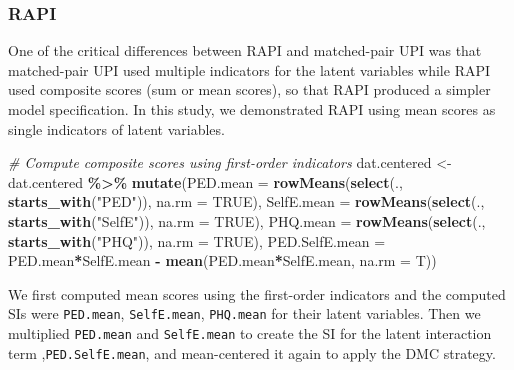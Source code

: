 \documentclass[
  man]{apa7}
\newenvironment{Shaded}{\begin{snugshade}}{\end{snugshade}}
\newcommand{\AttributeTok}[1]{\textcolor[rgb]{0.13,0.29,0.53}{#1}}
\newcommand{\CommentTok}[1]{\textcolor[rgb]{0.56,0.35,0.01}{\textit{#1}}}
\newcommand{\ConstantTok}[1]{\textcolor[rgb]{0.56,0.35,0.01}{#1}}
\newcommand{\FunctionTok}[1]{\textcolor[rgb]{0.13,0.29,0.53}{\textbf{#1}}}
\newcommand{\NormalTok}[1]{#1}
\newcommand{\OtherTok}[1]{\textcolor[rgb]{0.56,0.35,0.01}{#1}}
\newcommand{\SpecialCharTok}[1]{\textcolor[rgb]{0.81,0.36,0.00}{\textbf{#1}}}
\newcommand{\StringTok}[1]{\textcolor[rgb]{0.31,0.60,0.02}{#1}}
\begin{document}
\hypertarget{rapi}{%
\subsubsection{RAPI}\label{rapi}}

One of the critical differences between RAPI and matched-pair UPI was that matched-pair UPI used multiple indicators for the latent variables while RAPI used composite scores (sum or mean scores), so that RAPI produced a simpler model specification. In this study, we demonstrated RAPI using mean scores as single indicators of latent variables.

\begin{Shaded}
\begin{Highlighting}[]
\CommentTok{\# Compute composite scores using first{-}order indicators}
\NormalTok{dat.centered }\OtherTok{\textless{}{-}}\NormalTok{ dat.centered }\SpecialCharTok{\%\textgreater{}\%}
  \FunctionTok{mutate}\NormalTok{(}\AttributeTok{PED.mean =} \FunctionTok{rowMeans}\NormalTok{(}\FunctionTok{select}\NormalTok{(., }\FunctionTok{starts\_with}\NormalTok{(}\StringTok{"PED"}\NormalTok{)), }\AttributeTok{na.rm =} \ConstantTok{TRUE}\NormalTok{),}
         \AttributeTok{SelfE.mean =} \FunctionTok{rowMeans}\NormalTok{(}\FunctionTok{select}\NormalTok{(., }\FunctionTok{starts\_with}\NormalTok{(}\StringTok{"SelfE"}\NormalTok{)), }\AttributeTok{na.rm =} \ConstantTok{TRUE}\NormalTok{),}
         \AttributeTok{PHQ.mean =} \FunctionTok{rowMeans}\NormalTok{(}\FunctionTok{select}\NormalTok{(., }\FunctionTok{starts\_with}\NormalTok{(}\StringTok{"PHQ"}\NormalTok{)), }\AttributeTok{na.rm =} \ConstantTok{TRUE}\NormalTok{),}
         \AttributeTok{PED.SelfE.mean =}\NormalTok{ PED.mean}\SpecialCharTok{*}\NormalTok{SelfE.mean }\SpecialCharTok{{-}} \FunctionTok{mean}\NormalTok{(PED.mean}\SpecialCharTok{*}\NormalTok{SelfE.mean, }\AttributeTok{na.rm =}\NormalTok{ T))}
\end{Highlighting}
\end{Shaded}

We first computed mean scores using the first-order indicators and the computed SIs were \texttt{PED.mean}, \texttt{SelfE.mean}, \texttt{PHQ.mean} for their latent variables. Then we multiplied \texttt{PED.mean} and \texttt{SelfE.mean} to create the SI for the latent interaction term ,\texttt{PED.SelfE.mean}, and mean-centered it again to apply the DMC strategy.
\end{document}
